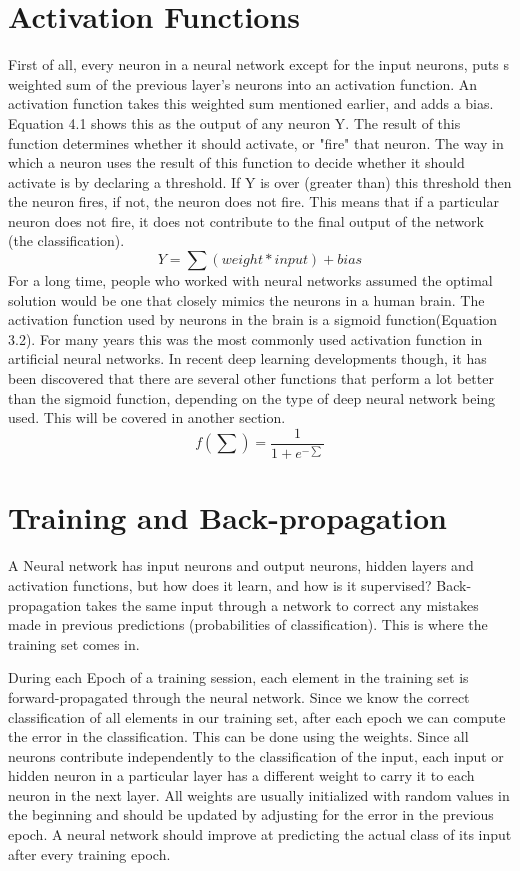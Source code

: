 \documentclass[12pt]{report} %
\begin{document}
\section{Activation Functions}	
	First of all, every neuron in a neural network except for the input neurons, puts s weighted sum of the previous layer's neurons into an activation function. An activation function takes this weighted sum mentioned earlier, and adds a bias. Equation 4.1 shows this as the output of any neuron Y. The result of this function determines whether it should activate, or "fire" that neuron. The way in which a neuron uses the result of this function to decide whether it should activate is by declaring a threshold. If Y is over (greater than) this threshold then the neuron fires, if not, the neuron does not fire. This means that if a particular neuron does not fire, it does not contribute to the final output of the network (the classification)\cite{activationMedium}. 
\begin{equation}
Y = \sum  (weight * input) + bias
\end{equation}	
	For a long time, people who worked with neural networks assumed the optimal solution would be one that closely mimics the neurons in a human brain. The activation function used by neurons in the brain is a sigmoid function(Equation 3.2)\cite{KubatMachineLearn}. For many years this was the most commonly used activation function in artificial neural networks. In recent deep learning developments though, it has been discovered that there are several other functions that perform a lot better than the sigmoid function, depending on the type of deep neural network being used. This will be covered in another section.
\begin{equation}
f(\sum) = \frac{1}{1+e^{-\sum}}
\end{equation}		 

\section{Training and Back-propagation}	

 	A Neural network has input neurons and output neurons, hidden layers and activation functions, but how does it learn, and how is it supervised? Back-propagation takes the same input through a network to correct any mistakes made in previous predictions (probabilities of classification). This is where the training set comes in. 
	
	During each Epoch of a training session, each element in the training set is forward-propagated through the neural network. Since we know the correct classification of all elements in our training set, after each epoch we can compute the error in the classification. This can be done using the weights. Since all neurons contribute independently to the classification of the input, each input or hidden neuron in a particular layer has a different weight to carry it to each neuron in the next layer. All weights are usually initialized with random values in the beginning and should be updated by adjusting for the error in the previous epoch. A neural network should improve at predicting the actual class of its input after every training epoch. 
	
\end{document}
